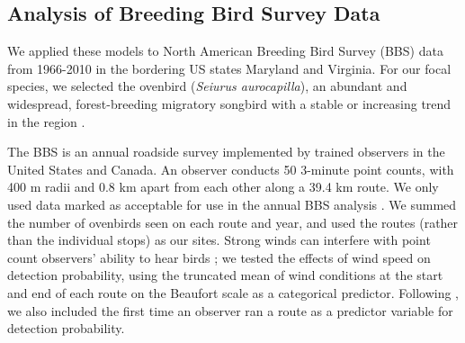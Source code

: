 \documentclass[12pt]{article}
\begin{document}

\subsection{Analysis of Breeding Bird Survey Data}

We applied these models to North American Breeding Bird Survey
(BBS) data from 1966-2010 in the bordering US states
Maryland and Virginia. For our focal species, we selected the
ovenbird (\textit{Seiurus aurocapilla}), an abundant and widespread,
forest-breeding migratory songbird with a stable or increasing trend in the region \citep{porneluzi_etal:2011}.

The BBS is an annual roadside survey implemented by trained
observers in the United States and Canada. An observer conducts 50
3-minute point counts, with 400 m radii and 0.8 km apart from each other along a
39.4 km route. We only used data marked as acceptable for use in the annual BBS
analysis \citep{sauer_etal:1994auk}.  We summed the number of ovenbirds
seen on each route and year, and used the routes (rather
than the individual stops) as our sites.
Strong winds can interfere with point count observers' ability
to hear birds \citep{simons_etal:2007}; we tested the effects of wind
speed on detection probability, using the truncated mean of wind conditions at the start and end of
each route on the Beaufort scale as a categorical predictor. 
Following \citet{link_sauer:2002},
we also included the first time an observer ran a route as a predictor variable for detection
probability.
\end{document}
